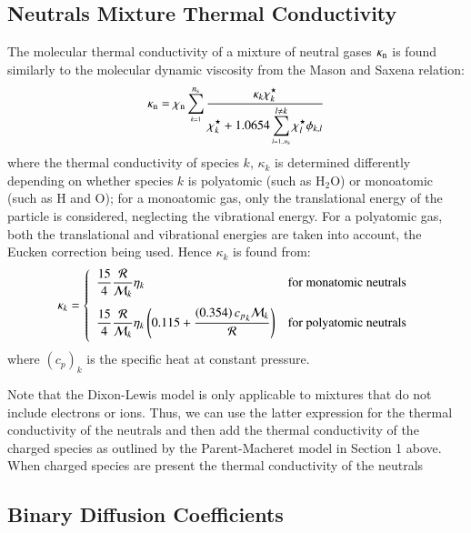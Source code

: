 \documentclass{warpdoc}
\newcommand{\alb}{\vspace{0.1cm}\\} %
\newcommand{\cp}{{c_p}}
\newcommand{\ns}{{{n}_{\rm s}}}
\newcommand{\mfa}{\scriptscriptstyle}
\newcommand{\mfd}{\displaystyle}
\begin{document}
 
\subsection{Neutrals Mixture Thermal Conductivity}

The molecular thermal conductivity of a mixture of neutral gases $\kappa_{\rm n}$ is found similarly to the molecular dynamic viscosity from the Mason and Saxena \cite{gen:mason-saxena} relation:
%
\begin{equation}
\kappa_{\rm n}= \chi_{\rm n} \mfd\sum_{\mfa k=1}^{\ns}  \mfd \frac{\mfd\kappa_k \chi_k^\star}
                     {\mfd \chi_k^\star + \mfd 1.0654
                          \mfd\sum_{\mfa l=1..\ns}^{l \neq k}  {\chi}_l^\star \phi_{k,l}}
\label{eqn:moltherm-mixture}
\end{equation}
%
where the thermal conductivity of species $k$, $\kappa_k$ is determined
differently depending on whether
species $k$ is polyatomic (such as H$_2$O) or monoatomic
(such as H and O); for a monoatomic gas, only the
translational energy of the particle is considered,
neglecting the vibrational energy. For a polyatomic gas,
both the translational and vibrational energies are taken into
account, the Eucken correction being used. Hence $\kappa_k$
is found from:
%
\begin{equation}
\kappa_k = \left\{ \begin{array}{ll}
\vspace{0.2cm}
\mfd\frac{15}{4} \mfd\frac{\cal R}{{\cal M}_k} \eta_k & {\rm for~monatomic~neutrals} \alb
\mfd\frac{15}{4} \mfd\frac{\cal R}{{\cal M}_k} \eta_k \left(  0.115 +
   \mfd\frac{ \left( 0.354 \right) {\cp}_k{\cal M}_k}{\cal R}  \right)
        & {\rm for~polyatomic~neutrals} \alb
\end{array}
\right.
\label{eqn:moltherm-kappa}
\end{equation}
%
where $(c_p)_k$ is the specific heat at constant pressure.

Note that the Dixon-Lewis model is only applicable to mixtures that do not include electrons or ions. Thus, we can use the latter expression for the thermal conductivity of the neutrals and then add the thermal conductivity of the charged species as outlined by the Parent-Macheret model in Section 1 above. When charged species are present the thermal conductivity of the neutrals 


\subsection{Binary Diffusion Coefficients}
\end{document}
